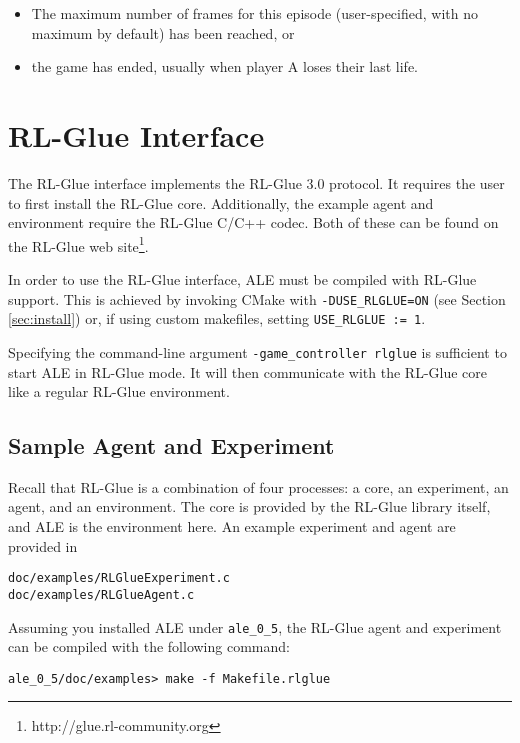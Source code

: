 \documentclass[12pt]{article}
\begin{document}
\begin{itemize}
  \item{The maximum number of frames for this episode (user-specified, with no maximum by default) has been reached, or}
  \item{the game has ended, usually when player A loses their last life.}
\end{itemize}

\section{RL-Glue Interface}\label{sec:rlglue_interface}

The RL-Glue interface implements the RL-Glue 3.0 protocol.
It requires the user to first install the RL-Glue core. Additionally, the example agent and 
environment require the RL-Glue C/C++ codec. Both of these can be found on the RL-Glue web
site\footnote{http://glue.rl-community.org}.

In order to use the RL-Glue interface, ALE must be compiled with RL-Glue support. This is achieved
by invoking CMake with \verb+-DUSE_RLGLUE=ON+ (see Section \ref{sec:install}) or, if using
custom makefiles, setting \verb+USE_RLGLUE := 1+. 

Specifying the command-line argument \verb+-game_controller rlglue+ is sufficient to start ALE in 
RL-Glue mode. It will then communicate with the RL-Glue core like a regular RL-Glue environment.

\subsection{Sample Agent and Experiment}

Recall that RL-Glue is a combination of four processes: a core, an experiment, an agent, and
an environment. The core is provided by the RL-Glue library itself, and ALE is the environment
here. An example experiment and agent are provided in 

\begin{verbatim}
doc/examples/RLGlueExperiment.c
doc/examples/RLGlueAgent.c
\end{verbatim}

Assuming you installed ALE under \verb+ale_0_5+, the RL-Glue agent and experiment
can be compiled with the following command: 

\begin{verbatim}
ale_0_5/doc/examples> make -f Makefile.rlglue 
\end{verbatim}
\end{document}
